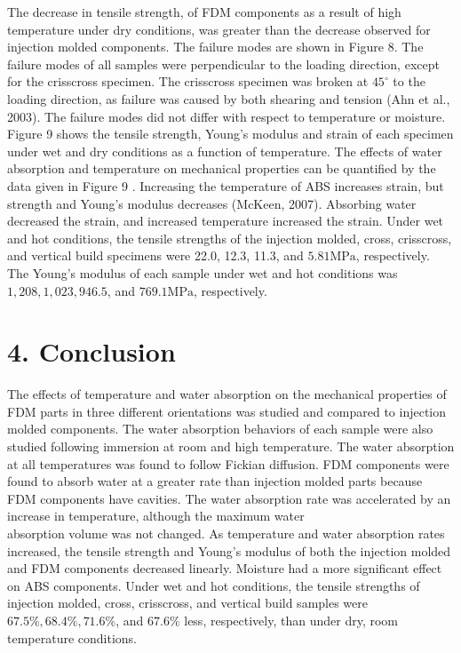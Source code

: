 \documentclass[10pt]{article}
\begin{document}
The decrease in tensile strength, of FDM components as a result of high temperature under dry conditions, was greater than the decrease observed for injection molded components. The failure modes are shown in Figure 8. The failure modes of all samples were perpendicular to the loading direction, except for the crisscross specimen. The crisscross specimen was broken at $45^{\circ}$ to the loading direction, as failure was caused by both shearing and tension (Ahn et al., 2003). The failure modes did not differ with respect to temperature or moisture. Figure 9 shows the tensile strength, Young's modulus and strain of each specimen under wet and dry conditions as a function of temperature. The effects of water absorption and temperature on mechanical properties can be quantified by the data given in Figure 9 . Increasing the temperature of ABS increases strain, but strength and Young's modulus decreases (McKeen, 2007). Absorbing water decreased the strain, and increased temperature increased the strain. Under wet and hot conditions, the tensile strengths of the injection molded, cross, crisscross, and vertical build specimens were 22.0, 12.3, 11.3, and $5.81 \mathrm{MPa}$, respectively. The Young's modulus of each sample under wet and hot conditions was $1,208,1,023,946.5$, and $769.1 \mathrm{MPa}$, respectively.

\section*{4. Conclusion}
The effects of temperature and water absorption on the mechanical properties of FDM parts in three different orientations was studied and compared to injection molded components. The water absorption behaviors of each sample were also studied following immersion at room and high temperature. The water absorption at all temperatures was found to follow Fickian diffusion. FDM components were found to absorb water at a greater rate than injection molded parts because FDM components have cavities. The water absorption rate was accelerated by an increase in temperature, although the maximum water\\
absorption volume was not changed. As temperature and water absorption rates increased, the tensile strength and Young's modulus of both the injection molded and FDM components decreased linearly. Moisture had a more significant effect on ABS components. Under wet and hot conditions, the tensile strengths of injection molded, cross, crisscross, and vertical build samples were $67.5 \%, 68.4 \%, 71.6 \%$, and $67.6 \%$ less, respectively, than under dry, room temperature conditions.
\end{document}
